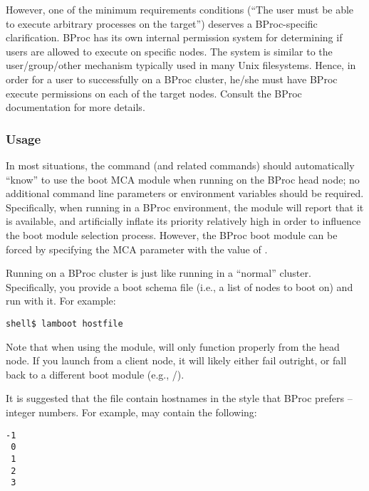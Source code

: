 However, one of the minimum requirements conditions (``The user must
be able to execute arbitrary processes on the target'') deserves a
BProc-specific clarification.  BProc has its own internal permission
system for determining if users are allowed to execute on specific
nodes.  The system is similar to the user/group/other mechanism
typically used in many Unix filesystems.  Hence, in order for a user
to successfully  on a BProc cluster, he/she must have
BProc execute permissions on each of the target nodes.  Consult the
BProc documentation for more details.


\subsubsection{Usage}

In most situations, the  command (and related commands)
should automatically ``know'' to use the  boot MCA module
when running on the BProc head node; no additional command line
parameters or environment variables should be required.  
%
Specifically, when running in a BProc environment, the 
module will report that it is available, and artificially inflate its
priority relatively high in order to influence the boot module
selection process.
%
However, the BProc boot module can be forced by specifying the
 MCA parameter with the value of
.

Running  on a BProc cluster is just like running
 in a ``normal'' cluster.  Specifically, you provide a
boot schema file (i.e., a list of nodes to boot on) and run
 with it.  For example:

\lstset{style=lam-cmdline}
\begin{lstlisting}
shell$ lamboot hostfile
\end{lstlisting}

Note that when using the  module,  will only
function properly from the head node.  If you launch 
from a client node, it will likely either fail outright, or fall back
to a different boot module (e.g., /).

It is suggested that the  file contain hostnames in the
style that BProc prefers -- integer numbers.  For example,
 may contain the following:

\lstset{style=lam-shell}
\begin{lstlisting}
-1
 0
 1
 2
 3
\end{lstlisting}

